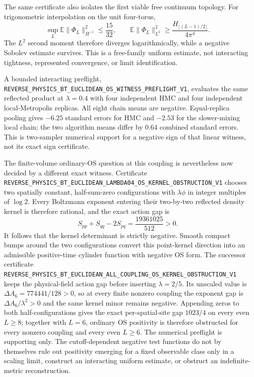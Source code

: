 \documentclass[11pt]{article}
\theoremstyle{definition}
\theoremstyle{remark}
\newcommand{\cert}[1]{\nolinkurl{#1}}
\begin{document}
The same certificate also isolates the first viable free continuum topology.
For trigonometric interpolation on the unit four-torus,
\[
 \sup_L\mathbb E\|\Phi_L\|_{H^{-1}}^2\leq\frac{15}{32},
 \qquad
 \mathbb E\|\Phi_L\|_{L^2}^2
 \geq\frac{H_{\lfloor(L-1)/2\rfloor}}{4\pi^4}.
\]
The \(L^2\) second moment therefore diverges logarithmically, while a negative
Sobolev estimate survives.  This is a free-family uniform estimate, not
interacting tightness, represented convergence, or limit identification.

A bounded interacting preflight,
\cert{REVERSE_PHYSICS_BT_EUCLIDEAN_OS_WITNESS_PREFLIGHT_V1}, evaluates the
same reflected product at \(\lambda=0.4\) with four independent HMC and four
independent local-Metropolis replicas.  All eight chain means are negative.
Equal-replica pooling gives \(-6.25\) standard errors for HMC and \(-2.53\)
for the slower-mixing local chain; the two algorithm means differ by \(0.64\)
combined standard errors.  This is two-sampler numerical support for a
negative sign of that linear witness, not its exact sign certificate.

The finite-volume ordinary-OS question at this coupling is nevertheless now
decided by a different exact witness.  Certificate
\cert{REVERSE_PHYSICS_BT_EUCLIDEAN_LAMBDA04_OS_KERNEL_OBSTRUCTION_V1}
chooses two spatially constant, half-sum-zero configurations with
\(\lambda\phi\) in integer multiples of \(\log 2\).  Every Boltzmann exponent
entering their two-by-two reflected density kernel is therefore rational, and
the exact action gap is
\[
 S_{pp}+S_{qq}-2S_{pq}=\frac{19361025}{512}>0.
\]
It follows that the kernel determinant is strictly negative.  Smooth compact
bumps around the two configurations convert this point-kernel direction into
an admissible positive-time cylinder function with negative OS form.  The
successor certificate
\cert{REVERSE_PHYSICS_BT_EUCLIDEAN_ALL_COUPLING_OS_KERNEL_OBSTRUCTION_V1}
keeps the physical-field action gap before inserting \(\lambda=2/5\).  Its
unscaled value is \(\Delta A_6=774441/128>0\), so at every finite nonzero
coupling the exponent gap is \(\Delta A_6/\lambda^2>0\) and the same kernel
minor remains negative.  Appending zeros to both half-configurations gives
the exact per-spatial-site gap \(1023/4\) on every even \(L\geq8\); together
with \(L=6\), ordinary OS positivity is therefore obstructed for every
nonzero coupling and every even \(L\geq6\).  The numerical preflight is
supporting only.  The cutoff-dependent negative test functions do not by
themselves rule out positivity emerging for a fixed observable class only in
a scaling limit, construct an interacting uniform estimate, or obstruct an
indefinite-metric reconstruction.
\end{document}

